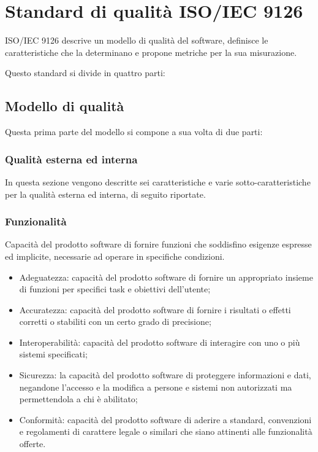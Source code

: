 \chapter{Standard di qualità ISO/IEC 9126}
ISO/IEC 9126 descrive un modello di qualità del software, definisce le caratteristiche che la determinano e propone metriche per la sua misurazione.

Questo standard si divide in quattro parti:

\section{Modello di qualità}
Questa prima parte del modello si compone a sua volta di due parti:

\subsection{Qualità esterna ed interna}
In questa sezione vengono descritte sei caratteristiche e varie sotto-caratteristiche per la qualità esterna ed interna, di seguito riportate.

\subsection{Funzionalità}
Capacità del prodotto software di fornire funzioni che soddisfino esigenze espresse ed implicite,
necessarie ad operare in specifiche condizioni.

\begin{itemize}
    \item Adeguatezza: capacità del prodotto software di fornire un appropriato insieme di funzioni per specifici task e obiettivi dell'utente;
    \item Accuratezza: capacità del prodotto software di fornire i risultati o effetti corretti o stabiliti con un certo grado di precisione;
    \item Interoperabilità: capacità del prodotto software di interagire con uno o più sistemi specificati;
    \item Sicurezza: la capacità del prodotto software di proteggere informazioni e dati, negandone l'accesso e la modifica a persone e sistemi non autorizzati ma permettendola a chi è abilitato;
    \item Conformità: capacità del prodotto software di aderire a standard, convenzioni e regolamenti di carattere legale o similari che siano attinenti alle funzionalità offerte.
\end{itemize}


